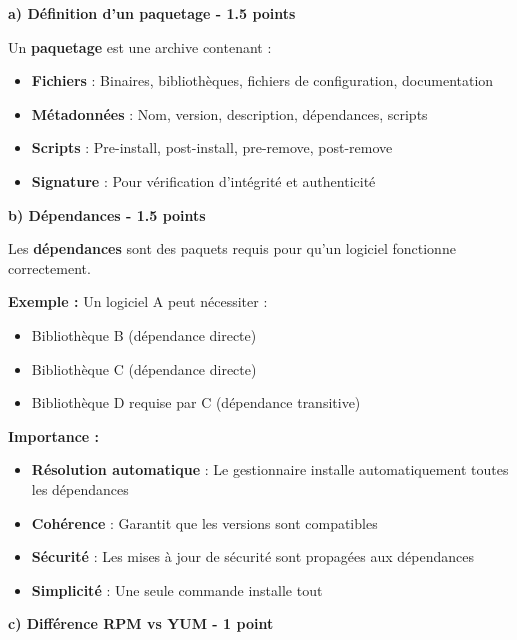 \documentclass[12pt,a4paper]{article}
\begin{document}
\begin{answerbox}
\textbf{a) Définition d'un paquetage - 1.5 points}

Un \textbf{paquetage} est une archive contenant :
\begin{itemize}
    \item \textbf{Fichiers} : Binaires, bibliothèques, fichiers de configuration, documentation
    \item \textbf{Métadonnées} : Nom, version, description, dépendances, scripts
    \item \textbf{Scripts} : Pre-install, post-install, pre-remove, post-remove
    \item \textbf{Signature} : Pour vérification d'intégrité et authenticité
\end{itemize}

\textbf{b) Dépendances - 1.5 points}

Les \textbf{dépendances} sont des paquets requis pour qu'un logiciel fonctionne correctement.

\textbf{Exemple :} Un logiciel A peut nécessiter :
\begin{itemize}
    \item Bibliothèque B (dépendance directe)
    \item Bibliothèque C (dépendance directe)
    \item Bibliothèque D requise par C (dépendance transitive)
\end{itemize}

\textbf{Importance :}
\begin{itemize}
    \item \textbf{Résolution automatique} : Le gestionnaire installe automatiquement toutes les dépendances
    \item \textbf{Cohérence} : Garantit que les versions sont compatibles
    \item \textbf{Sécurité} : Les mises à jour de sécurité sont propagées aux dépendances
    \item \textbf{Simplicité} : Une seule commande installe tout
\end{itemize}

\textbf{c) Différence RPM vs YUM - 1 point}


\end{answerbox}
\end{document}
